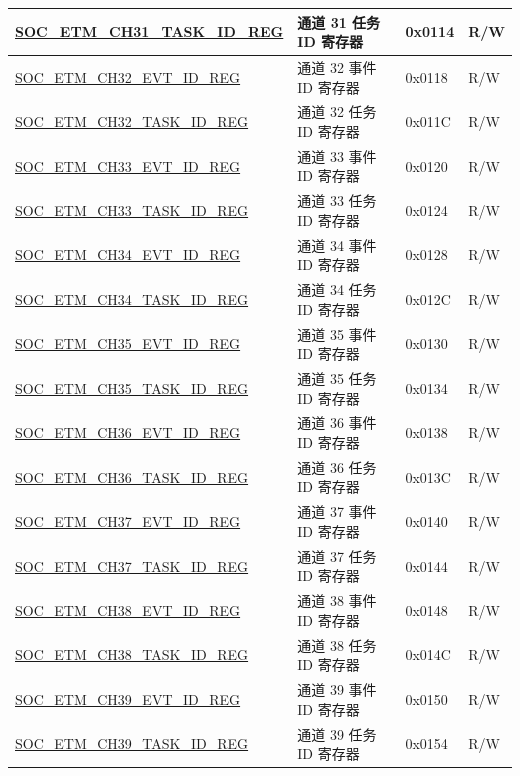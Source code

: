 \begin{longtable}{ | p{6cm} | p{6.4cm} | p{1.3cm} | p{1.8cm} | }
\hyperref[regdesc:SOCETMCH0TASKIDREG]{SOC\_ETM\_CH31\_TASK\_ID\_REG} & 通道 31 任务 ID 寄存器 & 0x0114 & R/W \\ \hline
\hyperref[regdesc:SOCETMCH0EVTIDREG]{SOC\_ETM\_CH32\_EVT\_ID\_REG} & 通道 32 事件 ID 寄存器 & 0x0118 & R/W \\ \hline
\hyperref[regdesc:SOCETMCH0TASKIDREG]{SOC\_ETM\_CH32\_TASK\_ID\_REG} & 通道 32 任务 ID 寄存器 & 0x011C & R/W \\ \hline
\hyperref[regdesc:SOCETMCH0EVTIDREG]{SOC\_ETM\_CH33\_EVT\_ID\_REG} & 通道 33 事件 ID 寄存器 & 0x0120 & R/W \\ \hline
\hyperref[regdesc:SOCETMCH0TASKIDREG]{SOC\_ETM\_CH33\_TASK\_ID\_REG} & 通道 33 任务 ID 寄存器 & 0x0124 & R/W \\ \hline
\hyperref[regdesc:SOCETMCH0EVTIDREG]{SOC\_ETM\_CH34\_EVT\_ID\_REG} & 通道 34 事件 ID 寄存器 & 0x0128 & R/W \\ \hline
\hyperref[regdesc:SOCETMCH0TASKIDREG]{SOC\_ETM\_CH34\_TASK\_ID\_REG} & 通道 34 任务 ID 寄存器 & 0x012C & R/W \\ \hline
\hyperref[regdesc:SOCETMCH0EVTIDREG]{SOC\_ETM\_CH35\_EVT\_ID\_REG} & 通道 35 事件 ID 寄存器 & 0x0130 & R/W \\ \hline
\hyperref[regdesc:SOCETMCH0TASKIDREG]{SOC\_ETM\_CH35\_TASK\_ID\_REG} & 通道 35 任务 ID 寄存器 & 0x0134 & R/W \\ \hline
\hyperref[regdesc:SOCETMCH0EVTIDREG]{SOC\_ETM\_CH36\_EVT\_ID\_REG} & 通道 36 事件 ID 寄存器 & 0x0138 & R/W \\ \hline
\hyperref[regdesc:SOCETMCH0TASKIDREG]{SOC\_ETM\_CH36\_TASK\_ID\_REG} & 通道 36 任务 ID 寄存器 & 0x013C & R/W \\ \hline
\hyperref[regdesc:SOCETMCH0EVTIDREG]{SOC\_ETM\_CH37\_EVT\_ID\_REG} & 通道 37 事件 ID 寄存器 & 0x0140 & R/W \\ \hline
\hyperref[regdesc:SOCETMCH0TASKIDREG]{SOC\_ETM\_CH37\_TASK\_ID\_REG} & 通道 37 任务 ID 寄存器 & 0x0144 & R/W \\ \hline
\hyperref[regdesc:SOCETMCH0EVTIDREG]{SOC\_ETM\_CH38\_EVT\_ID\_REG} & 通道 38 事件 ID 寄存器 & 0x0148 & R/W \\ \hline
\hyperref[regdesc:SOCETMCH0TASKIDREG]{SOC\_ETM\_CH38\_TASK\_ID\_REG} & 通道 38 任务 ID 寄存器 & 0x014C & R/W \\ \hline
\hyperref[regdesc:SOCETMCH0EVTIDREG]{SOC\_ETM\_CH39\_EVT\_ID\_REG} & 通道 39 事件 ID 寄存器 & 0x0150 & R/W \\ \hline
\hyperref[regdesc:SOCETMCH0TASKIDREG]{SOC\_ETM\_CH39\_TASK\_ID\_REG} & 通道 39 任务 ID 寄存器 & 0x0154 & R/W \\ \hline

\end{longtable}
